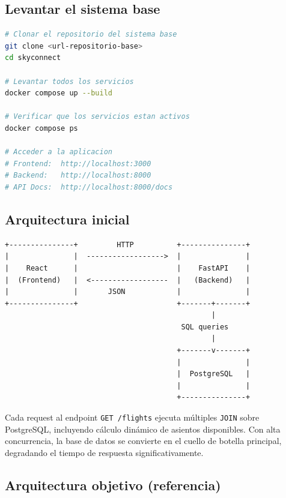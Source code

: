 \documentclass[12pt,a4paper]{article}
\begin{document}
\subsection{Levantar el sistema base}

\begin{lstlisting}[language=bash, caption={Comandos para levantar el entorno}]
# Clonar el repositorio del sistema base
git clone <url-repositorio-base>
cd skyconnect

# Levantar todos los servicios
docker compose up --build

# Verificar que los servicios estan activos
docker compose ps

# Acceder a la aplicacion
# Frontend:  http://localhost:3000
# Backend:   http://localhost:8000
# API Docs:  http://localhost:8000/docs
\end{lstlisting}

\subsection{Arquitectura inicial}

\begin{verbatim}
+---------------+         HTTP          +---------------+
|               |  ------------------>  |               |
|    React      |                       |    FastAPI    |
|  (Frontend)   |  <------------------  |   (Backend)   |
|               |       JSON            |               |
+---------------+                       +-------+-------+
                                                |
                                         SQL queries
                                                |
                                        +-------v-------+
                                        |               |
                                        |  PostgreSQL   |
                                        |               |
                                        +---------------+
\end{verbatim}

\begin{warningbox}
Cada request al endpoint \texttt{GET /flights} ejecuta múltiples \texttt{JOIN} sobre PostgreSQL, incluyendo cálculo dinámico de asientos disponibles. Con alta concurrencia, la base de datos se convierte en el cuello de botella principal, degradando el tiempo de respuesta significativamente.
\end{warningbox}

\subsection{Arquitectura objetivo (referencia)}
\end{document}
